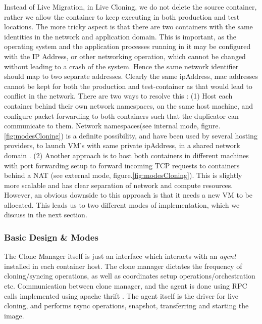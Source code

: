 Instead of Live Migration, in Live Cloning, we do not delete the source container, rather we allow the container to keep executing in both production and test locations.
The more tricky aspect is that there are two containers with the same identities in the network and application domain. 
This is important, as the operating system and the application processes running in it may be configured with the IP Address, or other networking operation, which cannot be changed without leading to a crash of the system.
Hence the same network identifier should map to two separate addresses.
Clearly the same ipAddress, mac addresses cannot be kept for both the production and test-container as that would lead to conflict in the network. 
There are two ways to resolve this : 
(1) Host each container behind their own network namespaces, on the same host machine, and configure packet forwarding to both containers such that the duplicator can communicate to them. 
Network namespaces(see internal mode, figure.\ref{fig:modesCloning}) is a definite possibility, and have been used by several hosting providers, to launch VM's with same private ipAddress, in a shared network domain \cite{OpenStack}. 
(2) Another approach is to host both containers in different machines with port forwarding setup to forward incoming TCP requests to containers behind a NAT (see external mode, figure.\ref{fig:modesCloning}). 
This is slightly more scalable and has clear separation of network and compute resources. 
However, an obvious downside to this approach is that it needs a new VM to be allocated.
This leads us to two different modes of implementation, which we discuss in the next section.


\subsubsection{Basic Design \& Modes}

The Clone Manager itself is just an interface which interacts with an \textit{agent} installed in each container host.
The clone manager dictates the frequency of cloning/syncing operations, as well as  coordinates setup operations/orchestration etc.
Communication between clone manager, and the agent is done using RPC calls implemented using apache thrift \cite{thrift}.
The agent itself is the driver for live cloning, and performs rsync operations, snapshot, transferring and starting the image.

